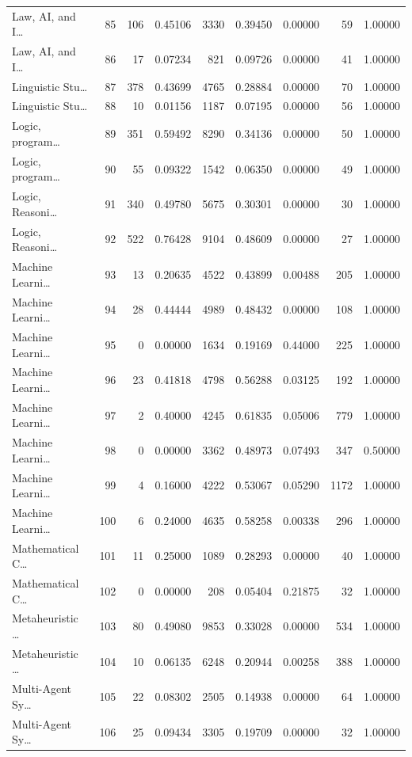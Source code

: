 \begin{table}
\begin{tabular}{lrrrrrrrr}
Law, AI, and I… & 85 & 106 & 0.45106 & 3330 & 0.39450 & 0.00000 & 59 & 1.00000 \\
Law, AI, and I… & 86 & 17 & 0.07234 & 821 & 0.09726 & 0.00000 & 41 & 1.00000 \\
Linguistic Stu… & 87 & 378 & 0.43699 & 4765 & 0.28884 & 0.00000 & 70 & 1.00000 \\
Linguistic Stu… & 88 & 10 & 0.01156 & 1187 & 0.07195 & 0.00000 & 56 & 1.00000 \\
Logic, program… & 89 & 351 & 0.59492 & 8290 & 0.34136 & 0.00000 & 50 & 1.00000 \\
Logic, program… & 90 & 55 & 0.09322 & 1542 & 0.06350 & 0.00000 & 49 & 1.00000 \\
Logic, Reasoni… & 91 & 340 & 0.49780 & 5675 & 0.30301 & 0.00000 & 30 & 1.00000 \\
Logic, Reasoni… & 92 & 522 & 0.76428 & 9104 & 0.48609 & 0.00000 & 27 & 1.00000 \\
Machine Learni… & 93 & 13 & 0.20635 & 4522 & 0.43899 & 0.00488 & 205 & 1.00000 \\
Machine Learni… & 94 & 28 & 0.44444 & 4989 & 0.48432 & 0.00000 & 108 & 1.00000 \\
Machine Learni… & 95 & 0 & 0.00000 & 1634 & 0.19169 & 0.44000 & 225 & 1.00000 \\
Machine Learni… & 96 & 23 & 0.41818 & 4798 & 0.56288 & 0.03125 & 192 & 1.00000 \\
Machine Learni… & 97 & 2 & 0.40000 & 4245 & 0.61835 & 0.05006 & 779 & 1.00000 \\
Machine Learni… & 98 & 0 & 0.00000 & 3362 & 0.48973 & 0.07493 & 347 & 0.50000 \\
Machine Learni… & 99 & 4 & 0.16000 & 4222 & 0.53067 & 0.05290 & 1172 & 1.00000 \\
Machine Learni… & 100 & 6 & 0.24000 & 4635 & 0.58258 & 0.00338 & 296 & 1.00000 \\
Mathematical C… & 101 & 11 & 0.25000 & 1089 & 0.28293 & 0.00000 & 40 & 1.00000 \\
Mathematical C… & 102 & 0 & 0.00000 & 208 & 0.05404 & 0.21875 & 32 & 1.00000 \\
Metaheuristic … & 103 & 80 & 0.49080 & 9853 & 0.33028 & 0.00000 & 534 & 1.00000 \\
Metaheuristic … & 104 & 10 & 0.06135 & 6248 & 0.20944 & 0.00258 & 388 & 1.00000 \\
Multi-Agent Sy… & 105 & 22 & 0.08302 & 2505 & 0.14938 & 0.00000 & 64 & 1.00000 \\
Multi-Agent Sy… & 106 & 25 & 0.09434 & 3305 & 0.19709 & 0.00000 & 32 & 1.00000 \\

\end{tabular}
\end{table}
